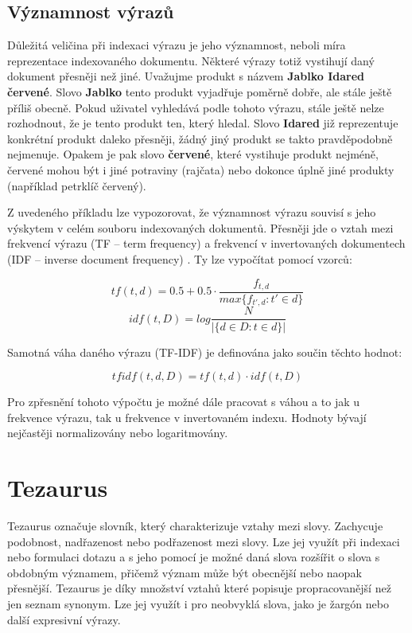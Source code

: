 \documentclass[FM,DP]{tulthesis}
\begin{document}
\subsection{Významnost výrazů}

Důležitá veličina při indexaci výrazu je jeho významnost, neboli míra reprezentace indexovaného
dokumentu. Některé výrazy totiž vystihují daný dokument přesněji než jiné. Uvažujme produkt
s názvem \textbf{Jablko Idared červené}. Slovo \textbf{Jablko} tento produkt vyjadřuje poměrně dobře, 
ale stále ještě příliš obecně. Pokud uživatel vyhledává podle tohoto výrazu, stále ještě nelze 
rozhodnout, že je tento produkt ten, který hledal. Slovo \textbf{Idared} již reprezentuje konkrétní
produkt daleko přesněji, žádný jiný produkt se takto pravděpodobně nejmenuje. Opakem je pak
slovo \textbf{červené}, které vystihuje produkt nejméně, červené mohou být i jiné potraviny (rajčata)
nebo dokonce úplně jiné produkty (například petrklíč červený). 

Z uvedeného příkladu lze vypozorovat, že významnost výrazu souvisí s jeho výskytem v celém
souboru indexovaných dokumentů. Přesněji jde o vztah mezi frekvencí výrazu (TF -- term frequency) 
a frekvencí v invertovaných dokumentech (IDF -- inverse document frequency) \cite[strana~21]{strossa}. 
Ty lze vypočítat pomocí vzorců:

\[tf(t,d) = 0.5 + 0.5 \cdot \frac{f_{t,d}}{max\{f_{{t}',d}:{t}'\in d\}}\]
\vspace{1mm}
\[idf(t,D)=log \frac{N}{\left | \{d\in D:t\in d\} \right |}\]
\vspace{1mm}

Samotná váha daného výrazu (TF-IDF) \label{tfidf} je definována jako součin těchto hodnot:

\vspace{1mm}
\[tfidf(t,d,D) = tf(t,d) \cdot idf(t,D)\]
\vspace{0mm}

Pro zpřesnění tohoto výpočtu je možné dále pracovat s váhou a to jak u frekvence výrazu, 
tak u frekvence v invertovaném indexu. Hodnoty bývají nejčastěji normalizovány nebo
logaritmovány.

\section{Tezaurus}

Tezaurus označuje slovník, který charakterizuje vztahy mezi slovy. Zachycuje podobnost, 
nadřazenost nebo podřazenost mezi slovy. Lze jej využít při indexaci nebo formulaci 
dotazu a s jeho pomocí je možné daná slova rozšířit o slova s obdobným významem, 
přičemž význam může být obecnější nebo naopak přesnější. Tezaurus je díky množství
vztahů které popisuje propracovanější než jen seznam synonym. Lze jej využít 
i pro neobvyklá slova, jako je žargón nebo další expresivní výrazy.
\end{document}
